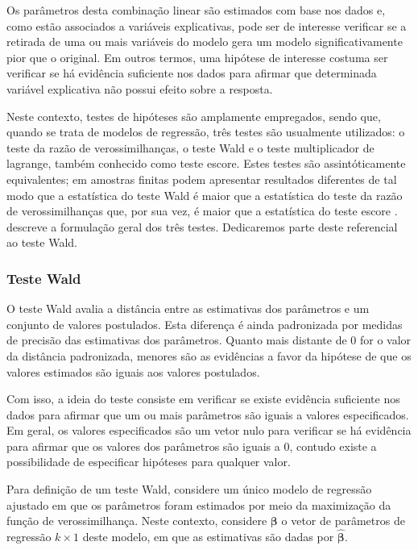 Os parâmetros desta combinação linear são estimados com base nos dados e, como estão associados a variáveis explicativas, pode ser de interesse verificar se a retirada de uma ou mais variáveis do modelo gera um modelo significativamente pior que o original. Em outros termos, uma hipótese de interesse costuma ser verificar se há evidência suficiente nos dados para afirmar que determinada variável explicativa não possui efeito sobre a resposta.

Neste contexto, testes de hipóteses são amplamente empregados, sendo que, quando se trata de modelos de regressão, três testes são usualmente utilizados: o teste da razão de verossimilhanças, o teste Wald e o teste multiplicador de lagrange, também conhecido como teste escore. Estes testes são assintóticamente equivalentes; em amostras finitas podem apresentar resultados diferentes de tal modo que a estatística do teste Wald é maior que a estatística do teste da razão de verossimilhanças que, por sua vez, é maior que a estatística do teste escore \citep{conflict}. \citet{engle} descreve a formulação geral dos três testes. Dedicaremos parte deste referencial ao teste Wald.

\subsubsection{Teste Wald}

O teste Wald \citep{wald} avalia a distância entre as estimativas dos parâmetros e um conjunto de valores postulados. Esta diferença é ainda padronizada por medidas de precisão das estimativas dos parâmetros. Quanto mais distante de 0 for o valor da distância padronizada, menores são as evidências a favor da hipótese de que os valores estimados são iguais aos valores postulados.

Com isso, a ideia do teste consiste em verificar se existe evidência suficiente nos dados para afirmar que um ou mais parâmetros são iguais a valores especificados. Em geral, os valores especificados são um vetor nulo para verificar se há evidência para afirmar que os valores dos parâmetros são iguais a 0, contudo existe a possibilidade de especificar hipóteses para qualquer valor.

Para definição de um teste Wald, considere um único modelo de regressão ajustado em que os parâmetros foram estimados por meio da maximização da função de verossimilhança. Neste contexto, considere $\boldsymbol{\beta}$ o vetor de parâmetros de regressão $k \times 1$ deste modelo, em que as estimativas são dadas por $\boldsymbol{\hat\beta}$.

